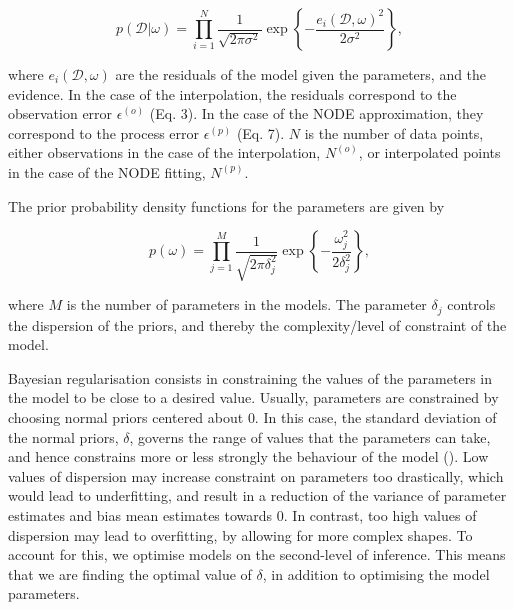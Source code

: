\documentclass[11pt, oneside]{article}
\begin{document}
\vspace{-0.5cm}
\begin{equation}
	p( \mathcal{D} | \omega) = \prod_{i=1}^{N} \frac{1}{\sqrt{2\pi\sigma^2}}  \exp \left\{ -\frac{e_i(\mathcal{D},\omega)^2}{2\sigma^2}  \right\},
\end{equation}

where $e_i(\mathcal{D},\omega)$ are the residuals of the model given the parameters, and the evidence. 
In the case of the interpolation, the residuals correspond to the observation error $\epsilon^{(o)}$ (Eq. 3).
In the case of the NODE approximation, they correspond to the process error $\epsilon^{(p)}$ (Eq. 7).
$N$ is the number of data points, either observations in the case of the interpolation, $N^{(o)}$, or interpolated points in the case of the NODE fitting, $N^{(p)}$.

The prior probability density functions for the parameters are given by

\vspace{-0.5cm}
\begin{equation}
	p(\omega) = \prod_{j=1}^{M} \frac{1}{\sqrt{2\pi\delta_j^2}}  \exp \left\{ -\frac{\omega_j^2}{2\delta_j^2}  \right\},
\end{equation}

where $M$ is the number of parameters in the models.
The parameter $\delta_j$ controls the dispersion of the priors, and thereby the complexity/level of constraint of the model.

Bayesian regularisation consists in constraining the values of the parameters in the model to be close to a desired value. 
Usually, parameters are constrained by choosing normal priors centered about 0.
In this case, the standard deviation of the normal priors, $\delta$, governs the range of values that the parameters can take, and hence constrains more or less strongly the behaviour of the model (\cite{Cawley2007}).
Low values of dispersion may increase constraint on parameters too drastically, which would lead to underfitting, and result in a reduction of the variance of parameter estimates and bias mean estimates towards 0.
In contrast, too high values of dispersion may lead to overfitting, by allowing for more complex shapes.
To account for this, we optimise models on the second-level of inference.
This means that we are finding the optimal value of $\delta$, in addition to optimising the model parameters. 
\end{document}

